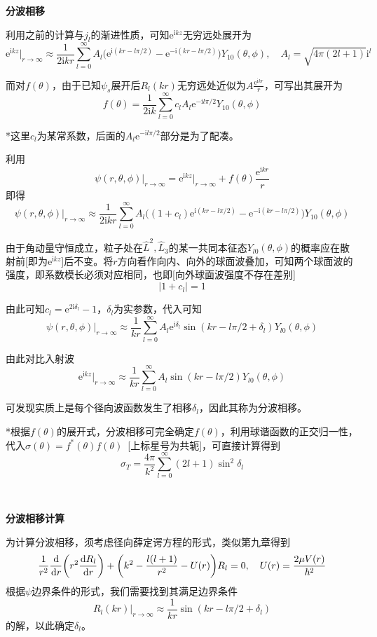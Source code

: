 \documentclass[a4paper,UTF8,fontset=windows]{ctexart}
\newcommand*{\dr}{\hspace{0.07em}\mathrm{d}}
\newcommand*{\ir}{\mathrm{i}}
\newcommand*{\er}{\mathrm{e}}
\begin{document}
\textbf{分波相移}

利用之前的计算与$j_l$的渐进性质，可知$\er^{\ir kz}$无穷远处展开为
$$\er^{\ir kz}\big|_{r\to\infty}\approx\frac{1}{2\ir kr}\sum_{l=0}^\infty A_l\big(\er^{\ir(kr-l\pi/2)}-\er^{-\ir(kr-l\pi/2)}\big)Y_{10}(\theta,\phi),\quad A_l=\sqrt{4\pi(2l+1)}\ir^l$$

而对$f(\theta)$，由于已知$\psi_s$展开后$R_l(kr)$无穷远处近似为$A\frac{\er^{\ir kr}}{r}$，可写出其展开为
$$f(\theta)=\frac{1}{2\ir k}\sum_{l=0}^\infty c_lA_l\er^{-\ir l\pi/2}Y_{10}(\theta,\phi)$$

*这里$c_l$为某常系数，后面的$A_l\er^{-\ir l\pi/2}$部分是为了配凑。

利用
$$\psi(r,\theta,\phi)\big|_{r\to\infty}=\er^{\ir kz}\big|_{r\to\infty}+f(\theta)\frac{\er^{\ir kr}}{r}$$
即得
$$\psi(r,\theta,\phi)\big|_{r\to\infty}\approx\frac{1}{2\ir kr}\sum_{l=0}^\infty A_l\big((1+c_l)\er^{\ir(kr-l\pi/2)}-\er^{-\ir(kr-l\pi/2)}\big)Y_{10}(\theta,\phi)$$

由于角动量守恒成立，粒子处在$\hat{L}^2,\hat{L}_3$的某一共同本征态$Y_{l0}(\theta,\phi)$的概率应在散射前[即为$\er^{\ir kz}$]后不变。将$r$方向看作向内、向外的球面波叠加，可知两个球面波的强度，即系数模长必须对应相同，也即[向外球面波强度不存在差别]
$$|1+c_l|=1$$

由此可知$c_l=\er^{2\ir\delta_l}-1$，$\delta_l$为实参数，代入可知
$$\psi(r,\theta,\phi)\big|_{r\to\infty}\approx\frac{1}{kr}\sum_{l=0}^\infty A_l\er^{\ir\delta_l}\sin(kr-l\pi/2+\delta_l)Y_{l0}(\theta,\phi)$$

由此对比入射波
$$\er^{\ir kz}\big|_{r\to\infty}\approx\frac{1}{kr}\sum_{l=0}^\infty A_l\sin(kr-l\pi/2)Y_{l0}(\theta,\phi)$$

可发现实质上是每个径向波函数发生了相移$\delta_l$，因此其称为分波相移。

*根据$f(\theta)$的展开式，分波相移可完全确定$f(\theta)$，利用球谐函数的正交归一性，代入$\sigma(\theta)=f^*(\theta)f(\theta)$\ [上标星号为共轭]，可直接计算得到
$$\sigma_T=\frac{4\pi}{k^2}\sum_{l=0}^\infty(2l+1)\sin^2\delta_l$$

\

\textbf{分波相移计算}

为计算分波相移，须考虑径向薛定谔方程的形式，类似第九章得到
$$\frac{1}{r^2}\frac{\dr}{\dr r}\bigg(r^2\frac{\dr R_l}{\dr r}\bigg)+\bigg(k^2-\frac{l(l+1)}{r^2}-U(r)\bigg)R_l=0,\quad U(r)=\frac{2\mu V(r)}{\hbar^2}$$
根据$\psi$边界条件的形式，我们需要找到其满足边界条件
$$R_l(kr)\big|_{r\to\infty}\approx\frac{1}{kr}\sin(kr-l\pi/2+\delta_l)$$
的解，以此确定$\delta_l$。
\end{document}
